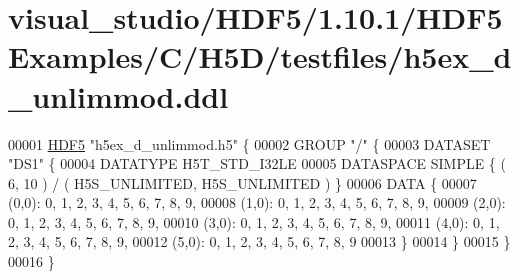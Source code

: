 \hypertarget{visual__studio_2_h_d_f5_21_810_81_2_h_d_f5_examples_2_c_2_h5_d_2testfiles_2h5ex__d__unlimmod_8ddl_source}{}\section{visual\+\_\+studio/\+H\+D\+F5/1.10.1/\+H\+D\+F5\+Examples/\+C/\+H5\+D/testfiles/h5ex\+\_\+d\+\_\+unlimmod.ddl}
\label{visual__studio_2_h_d_f5_21_810_81_2_h_d_f5_examples_2_c_2_h5_d_2testfiles_2h5ex__d__unlimmod_8ddl_source}

\begin{DoxyCode}
00001 \hyperlink{namespace_h_d_f5}{HDF5} \textcolor{stringliteral}{"h5ex\_d\_unlimmod.h5"} \{
00002 GROUP \textcolor{stringliteral}{"/"} \{
00003    DATASET \textcolor{stringliteral}{"DS1"} \{
00004       DATATYPE  H5T\_STD\_I32LE
00005       DATASPACE  SIMPLE \{ ( 6, 10 ) / ( H5S\_UNLIMITED, H5S\_UNLIMITED ) \}
00006       DATA \{
00007       (0,0): 0, 1, 2, 3, 4, 5, 6, 7, 8, 9,
00008       (1,0): 0, 1, 2, 3, 4, 5, 6, 7, 8, 9,
00009       (2,0): 0, 1, 2, 3, 4, 5, 6, 7, 8, 9,
00010       (3,0): 0, 1, 2, 3, 4, 5, 6, 7, 8, 9,
00011       (4,0): 0, 1, 2, 3, 4, 5, 6, 7, 8, 9,
00012       (5,0): 0, 1, 2, 3, 4, 5, 6, 7, 8, 9
00013       \}
00014    \}
00015 \}
00016 \}
\end{DoxyCode}
